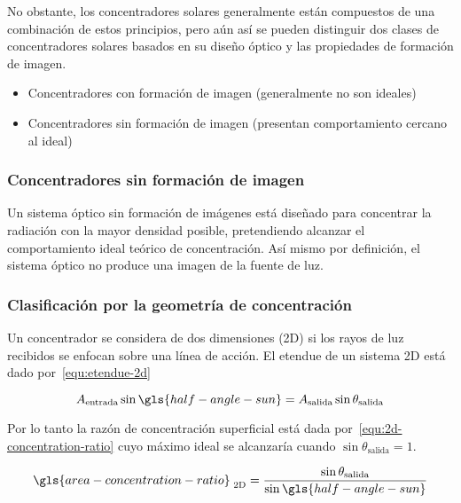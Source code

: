 		No obstante, los concentradores solares generalmente están compuestos de una combinación de estos principios, pero aún así se pueden distinguir dos clases de concentradores solares basados en su diseño óptico y las propiedades de formación de imagen.

		\begin{itemize}
			\item Concentradores con formación de imagen (generalmente no son ideales)
			\item Concentradores sin formación de imagen (presentan comportamiento cercano al ideal)
		\end{itemize}
		
		\subsubsection{Concentradores sin formación de imagen}
			
			Un sistema óptico sin formación de imágenes está diseñado para concentrar la radiación con la mayor densidad posible, pretendiendo alcanzar el comportamiento ideal teórico de concentración. Así mismo por definición, el sistema óptico no produce una imagen de la fuente de luz.
		
		\subsubsection{Clasificación por la geometría de concentración}
			
			Un concentrador se considera de dos dimensiones (2D) si los rayos de luz recibidos se enfocan sobre una línea de acción. El \gls{etendue} de un sistema 2D está dado por~\eqref{equ:etendue-2d}
			
			\begin{equation}\label{equ:etendue-2d}
				A_{\text{entrada}}\sin\gls{half-angle-sun} = A_{\text{salida}}\sin\theta_{\text{salida}}
			\end{equation}
			
			Por lo tanto la razón de concentración superficial está dada por~\eqref{equ:2d-concentration-ratio} cuyo máximo ideal se alcanzaría cuando \(\sin\theta_{\text{salida}} = 1\).
			
			\begin{equation}\label{equ:2d-concentration-ratio}
				\gls{area-concentration-ratio}_{\text{\ 2D}} = \dfrac{\sin\theta_{\text{salida}}}{\sin\gls{half-angle-sun}}
			\end{equation}
			
